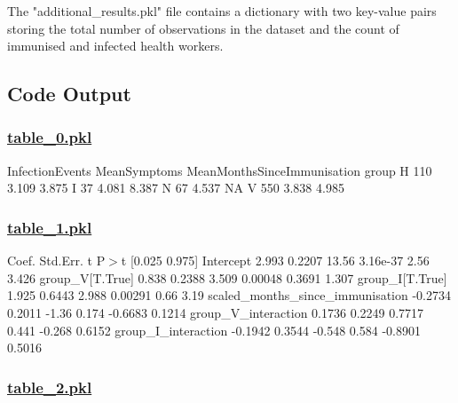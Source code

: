 \documentclass[11pt]{article}
\begin{document}
The "additional\_results.pkl" file contains a dictionary with two key-value pairs storing the total number of observations in the dataset and the count of immunised and infected health workers.

\subsection{Code Output}\hypertarget{file-table-0-pkl}{}

\subsubsection*{\hyperlink{code-Data Analysis-table-0-pkl}{table\_0.pkl}}

\begin{codeoutput}
       InfectionEvents  MeanSymptoms MeanMonthsSinceImmunisation
group                                                           
H                  110         3.109                       3.875
I                   37         4.081                       8.387
N                   67         4.537                          NA
V                  550         3.838                       4.985
\end{codeoutput}\hypertarget{file-table-1-pkl}{}

\subsubsection*{\hyperlink{code-Data Analysis-table-1-pkl}{table\_1.pkl}}

\begin{codeoutput}
                                   Coef.  Std.Err.      t     P$>$\textbar{}t\textbar{}  [0.025  0.975]
Intercept                          2.993    0.2207  13.56  3.16e-37    2.56   3.426
group\_V[T.True]                    0.838    0.2388  3.509   0.00048  0.3691   1.307
group\_I[T.True]                    1.925    0.6443  2.988   0.00291    0.66    3.19
scaled\_months\_since\_immunisation -0.2734    0.2011  -1.36     0.174 -0.6683  0.1214
group\_V\_interaction               0.1736    0.2249 0.7717     0.441  -0.268  0.6152
group\_I\_interaction              -0.1942    0.3544 -0.548     0.584 -0.8901  0.5016
\end{codeoutput}\hypertarget{file-table-2-pkl}{}

\subsubsection*{\hyperlink{code-Data Analysis-table-2-pkl}{table\_2.pkl}}
\end{document}
